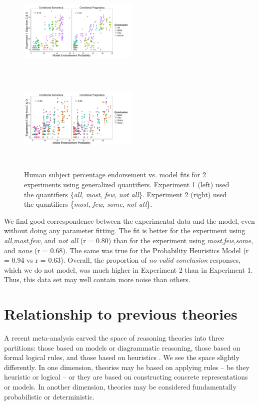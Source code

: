 \documentclass[10pt,letterpaper]{article}
\begin{document}
\begin{figure}[htp]
  \includegraphics[width=0.51\textwidth,height=4.5cm]{fig3a_multiScatter_AMFO_n6_alphabefore1}
    \includegraphics[width=0.51\textwidth,height=4.5cm]{fig3b_multiScatter_MFIE_n6_alphabefore1}
      \caption{Human subject percentage endorsement vs. model fits for 2 experiments using generalized quantifiers. Experiment 1 (left) used the quantifiers \{\emph{all}, \emph{most}, \emph{few}, \emph{not all}\}. Experiment 2 (right) used the quantifiers \{\emph{most}, \emph{few}, \emph{some}, \emph{not all}\}.}
  \label{fig:mfScatter}
\end{figure}


We find good correspondence between the experimental data and the model, even without doing any parameter fitting. The fit is better for the experiment using \emph{all},\emph{most},\emph{few}, and \emph{not all} (r = 0.80) than for the experiment using \emph{most},\emph{few},\emph{some}, and \emph{none} (r = 0.68). The same was true for the Probability Heuristics Model (r = 0.94 vs r = 0.63). Overall, the proportion of \emph{no valid conclusion} responses, which we do not model, was much higher in Experiment 2 than in Experiment 1. Thus, this data set may well contain more noise than others. 




\section{Relationship to previous theories}

A recent meta-analysis carved the space of reasoning theories into three partitions: those based on models or diagrammatic reasoning, those based on formal logical rules, and those based on heuristics \cite{Khemlani2012}. We see the space slightly differently. In one dimension, theories may be based on applying rules -- be they heuristic or logical -- or they are based on constructing concrete representations or models. In another dimension, theories may be considered fundamentally probabilistic or deterministic. 
\end{document}
